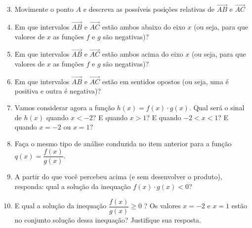 \documentclass[10 pt,usenames,dvipsnames, oneside]{article}
\begin{document}
\begin{enumerate}\setcounter{enumi}{2}
\item Movimente o ponto $A$ e descreva as possíveis posições relativas de $\overrightarrow{AB}$ e $\overrightarrow{AC}$
\item Em que intervalos $\overrightarrow{AB}$ e $\overrightarrow{AC}$ estão ambos abaixo do eixo $x$ (ou seja, para que valores de $x$ as funções $f$ e $g$ são negativas)?
\item Em que intervalos $\overrightarrow{AB}$ e $\overrightarrow{AC}$ estão ambos acima do eixo $x$ (ou seja, para que valores de $x$ as funções $f$ e $g$ são negativas)?
\item Em que intervalos $\overrightarrow{AB}$ e $\overrightarrow{AC}$ estão em sentidos opostos (ou seja, uma é positiva e outra é negativa)?
\item Vamos considerar agora a função $h(x) = f(x) \cdot g(x)$. Qual será o sinal de $h(x)$ quando $x < - 2$? E quando $x > 1$? E quando $-2 < x < 1$? E quando $x = -2$ ou $x = 1$? 
\item Faça o mesmo tipo de análise conduzida no item anterior para a função $q(x)=\dfrac{f(x)}{g(x)}$. 
\item A partir do que você percebeu acima (e sem desenvolver o produto), responda: qual a solução da inequação $f(x)\cdot g(x)<0$?
\item E qual a solução da inequação $\dfrac{f(x)}{g(x)}\geq0$ ? Os valores $x=-2$ e $x=1$ estão no conjunto solução dessa inequação? Justifique sua resposta.
\end{enumerate}
\end{document}
